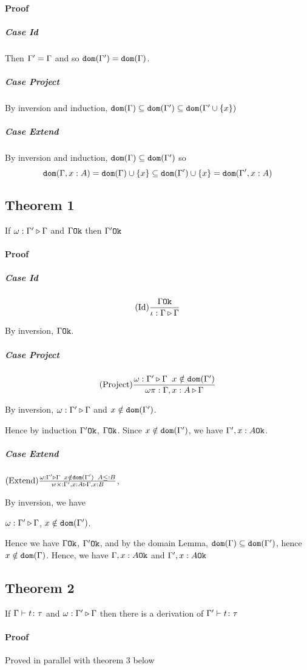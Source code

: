 {    \paragraph{Proof}
    \subparagraph{Case Id}
    Then $\Gamma' = \Gamma$ and so $\texttt{dom}(\Gamma') = \texttt{dom}(\Gamma)$.
    \subparagraph{Case Project}
    By inversion and induction, $\texttt{dom}(\Gamma)\subseteq\texttt{dom}(\Gamma')\subseteq\texttt{dom}(\Gamma'\cup\left\{x\right\})$
    \subparagraph{Case Extend}
    By inversion and induction, $\texttt{dom}(\Gamma)\subseteq\texttt{dom}(\Gamma')$ so 
    $$\texttt{dom}(\Gamma, x: A) = \texttt{dom}(\Gamma)\cup\left\{x\right\} \subseteq\texttt{dom}(\Gamma')\cup\left\{x\right\} = \texttt{dom}(\Gamma',x:A)$$
    \subsection{Theorem 1}
    If $\omega : \Gamma' \triangleright \Gamma$ and $\Gamma \texttt{Ok}$ then $\Gamma' \texttt{Ok}$
    \paragraph{Proof}
    \subparagraph{Case Id}
    $$(\text{Id}) \frac{\Gamma \texttt{Ok}}{\iota : \Gamma \triangleright \Gamma}$$

    By inversion, $\Gamma \texttt{Ok}$.

    \subparagraph{Case Project}
    $$(\text{Project}) \frac{\omega : \Gamma' \triangleright \Gamma\;\; x \notin \texttt{dom}(\Gamma')}{\omega \pi : \Gamma, x: A \triangleright \Gamma}$$

    By inversion, $\omega : \Gamma' \triangleright \Gamma$ and $x\notin \texttt{dom}(\Gamma')$.

    Hence by induction $\Gamma' \texttt{Ok}$, $\Gamma \texttt{Ok}$. Since $x\notin\texttt{dom}(\Gamma')$, we have $\Gamma', x:A \texttt{Ok}$.

    \subparagraph{Case Extend}
    $(\text{Extend}) \frac{\omega : \Gamma' \triangleright \Gamma\;\; x \notin \texttt{dom}(\Gamma')\;\; A \leq: B}{w \times : \Gamma', x: A \triangleright \Gamma, x: B}$, 

    By inversion, we have 

    $\omega : \Gamma' \triangleright \Gamma$, $x\notin\texttt{dom}(\Gamma')$.

    Hence we have $\Gamma \texttt{Ok}$, $\Gamma' \texttt{Ok}$, and by the domain Lemma, $\texttt{dom}(\Gamma)\subseteq\texttt{dom}(\Gamma')$, hence $x\notin\texttt{dom}(\Gamma)$. Hence, we have $\Gamma, x: A \texttt{Ok}$ and $\Gamma',x:A \texttt{Ok}$


    \subsection{Theorem 2}
    If $\Gamma \vdash t \colon \tau$ and $\omega : \Gamma' \triangleright \Gamma$ then there is a derivation of $\Gamma' \vdash t \colon \tau$

    \paragraph{Proof}
    Proved in parallel with theorem 3 below
}
